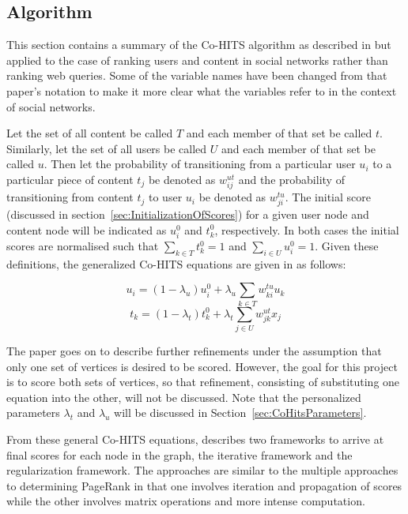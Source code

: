 \subsection{Algorithm}
\label{sec:CoHitsAlgorithm}

This section contains a summary of the Co-HITS algorithm as described in \cite{Deng2009} but applied to the case of ranking users and content in social networks rather than ranking web queries. Some of the variable names have been changed from that paper's notation to make it more clear what the variables refer to in the context of social networks.

Let the set of all content be called $T$ and each member of that set be called $t$. Similarly, let the set of all users be called $U$ and each member of that set be called $u$. Then let the probability of transitioning from a particular user $u_{i}$ to a particular piece of content $t_{j}$ be denoted as $w_{ij}^{ut}$ and the probability of transitioning from content $t_{j}$ to user $u_{i}$ be denoted as $w_{ji}^{tu}$. The initial score (discussed in section~\ref{sec:InitializationOfScores}) for a given user node and content node will be indicated as $u_{i}^{0}$ and $t_{k}^0$, respectively. In both cases the initial scores are normalised such that $\sum\limits_{k \in T} t_{k}^{0} = 1$ and $\sum\limits_{i \in U} u_{i}^{0} = 1$. Given these definitions, the generalized Co-HITS equations are given in \cite{Deng2009} as follows:

\begin{center}
\[u_{i} = (1 - \lambda_{u}) u_{i}^{0} + \lambda_{u}  \sum\limits_ {k \in T} w_{ki}^{tu} u_{k}\]
\[t_{k} = (1 - \lambda_{t}) t_{k}^{0} + \lambda_{t}  \sum\limits_ {j \in U} w_{jk}^{ut} x_{j}\]
\end{center}

The paper goes on to describe further refinements under the assumption that only one set of vertices is desired to be scored. However, the goal for this project is to score both sets of vertices, so that refinement, consisting of substituting one equation into the other, will not be discussed. Note that the personalized parameters $\lambda_{t}$ and $\lambda_{u}$ will be discussed in Section~\ref{sec:CoHitsParameters}.

From these general Co-HITS equations, \cite{Deng2009} describes two frameworks to arrive at final scores for each node in the graph, the iterative framework and the regularization framework. The approaches are similar to the multiple approaches to determining PageRank in that one involves iteration and propagation of scores while the other involves matrix operations and more intense computation.

